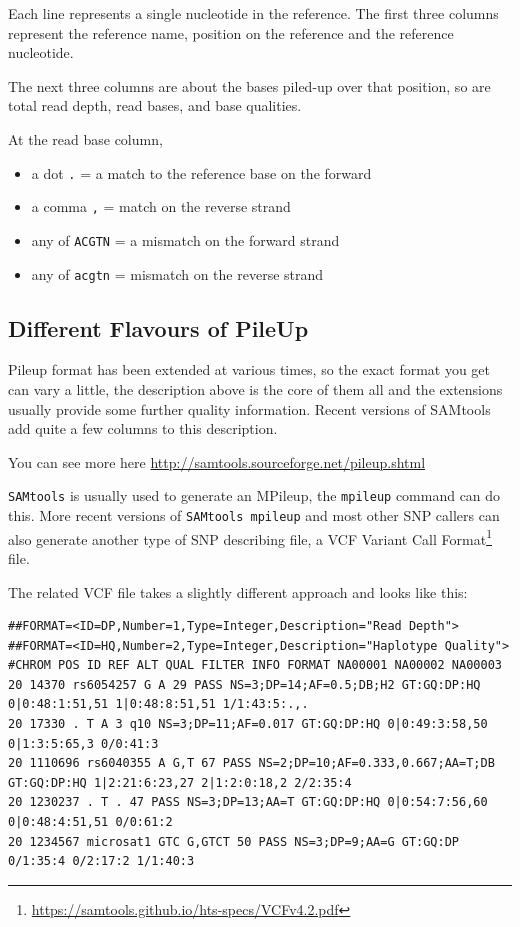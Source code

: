 \documentclass[12pt,]{book}
\providecommand{\tightlist}{%
  \setlength{\itemsep}{0pt}\setlength{\parskip}{0pt}}
\let\rmarkdownfootnote\footnote%
\def\footnote{\protect\rmarkdownfootnote}
\renewcommand{\href}[2]{#2\footnote{\url{#1}}}
\begin{document}
Each line represents a single nucleotide in the reference. The first
three columns represent the reference name, position on the reference
and the reference nucleotide.

The next three columns are about the bases piled-up over that position,
so are total read depth, read bases, and base qualities.

At the read base column,

\begin{itemize}
\tightlist
\item
  a dot \texttt{.} = a match to the reference base on the forward
\item
  a comma \texttt{,} = match on the reverse strand
\item
  any of \texttt{ACGTN} = a mismatch on the forward strand
\item
  any of \texttt{acgtn} = mismatch on the reverse strand
\end{itemize}

\subsection{Different Flavours of
PileUp}\label{different-flavours-of-pileup}

Pileup format has been extended at various times, so the exact format
you get can vary a little, the description above is the core of them all
and the extensions usually provide some further quality information.
Recent versions of SAMtools add quite a few columns to this description.

You can see more here \url{http://samtools.sourceforge.net/pileup.shtml}

\texttt{SAMtools} is usually used to generate an MPileup, the
\texttt{mpileup} command can do this. More recent versions of
\texttt{SAMtools\ mpileup} and most other SNP callers can also generate
another type of SNP describing file, a VCF
\href{https://samtools.github.io/hts-specs/VCFv4.2.pdf}{Variant Call
Format} file.

The related VCF file takes a slightly different approach and looks like
this:

\begin{verbatim}
##FORMAT=<ID=DP,Number=1,Type=Integer,Description="Read Depth">
##FORMAT=<ID=HQ,Number=2,Type=Integer,Description="Haplotype Quality">
#CHROM POS ID REF ALT QUAL FILTER INFO FORMAT NA00001 NA00002 NA00003
20 14370 rs6054257 G A 29 PASS NS=3;DP=14;AF=0.5;DB;H2 GT:GQ:DP:HQ 0|0:48:1:51,51 1|0:48:8:51,51 1/1:43:5:.,.
20 17330 . T A 3 q10 NS=3;DP=11;AF=0.017 GT:GQ:DP:HQ 0|0:49:3:58,50 0|1:3:5:65,3 0/0:41:3
20 1110696 rs6040355 A G,T 67 PASS NS=2;DP=10;AF=0.333,0.667;AA=T;DB GT:GQ:DP:HQ 1|2:21:6:23,27 2|1:2:0:18,2 2/2:35:4
20 1230237 . T . 47 PASS NS=3;DP=13;AA=T GT:GQ:DP:HQ 0|0:54:7:56,60 0|0:48:4:51,51 0/0:61:2
20 1234567 microsat1 GTC G,GTCT 50 PASS NS=3;DP=9;AA=G GT:GQ:DP 0/1:35:4 0/2:17:2 1/1:40:3
\end{verbatim}
\end{document}
